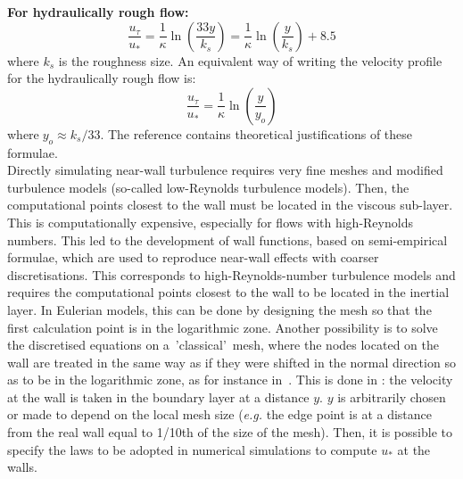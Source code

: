 \textbf{For hydraulically rough flow:}
\begin{equation}\label{eq:logarrough}
  \dfrac{u_\tau}{u_*}=\dfrac{1}{\kappa}\ln\left(  \dfrac{33 y}{k_{s}}\right)
  =\dfrac{1}{\kappa}\ln\left(  \dfrac{y}{k_{s}}\right)  +8.5
\end{equation}
where $k_{s}$ is the roughness size.
An equivalent way of writing the velocity profile for the hydraulically rough
flow is:%
\begin{equation}
  \dfrac{u_\tau}{u_*}=\dfrac{1}{\kappa}\ln\left(  \dfrac{y}{y_{o}}\right)
  \label{logarrough}%
\end{equation}
where$\;y_{o}\approx k_{s}/33$.
The reference \cite{Viollet2002} contains theoretical justifications of these formulae.\\

Directly simulating near-wall turbulence requires very fine
meshes and modified turbulence models (so-called low-Reynolds turbulence models).
Then, the computational points closest to the wall must be located in the viscous sub-layer.
This is computationally expensive, especially for flows with high-Reynolds numbers.
This led to the development of wall functions, based on semi-empirical formulae,
which are used to reproduce near-wall effects with coarser discretisations.
This corresponds to high-Reynolds-number turbulence models and requires
the computational points closest to the wall to be located in the inertial layer.
In Eulerian models, this can be done by designing the mesh so that
the first calculation point is in the logarithmic zone.
Another possibility is to solve the discretised equations
on a~'classical'~mesh, where the nodes located on the wall
are treated in the same way as if they were shifted in the
normal direction so as to be in the logarithmic zone, as for instance in~\cite{Kuzmin2007}.
This is done in : the velocity at the wall is taken in the boundary layer at a distance $y$.
$y$ is arbitrarily chosen or made to depend on the local mesh size
(\textit{e.g.} the edge point is at a distance from
the real wall equal to 1/10th of the size of the mesh).
Then, it is possible to specify the laws to be adopted in numerical
simulations to compute $u_*$ at the walls.

